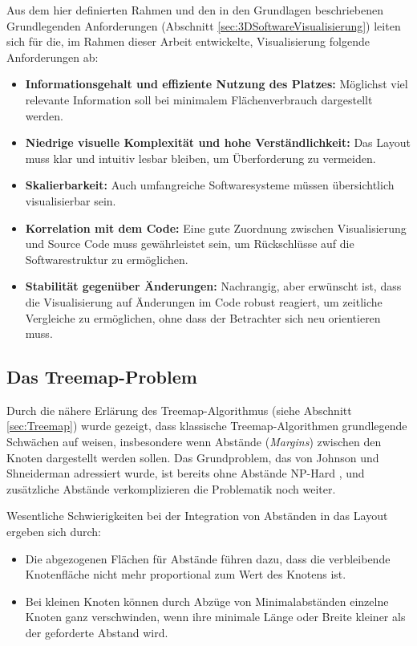 \smallskip

Aus dem hier definierten Rahmen und den in den Grundlagen beschriebenen Grundlegenden Anforderungen (Abschnitt \ref{sec:3DSoftwareVisualisierung}) leiten sich für die, im Rahmen dieser Arbeit entwickelte, Visualisierung folgende Anforderungen ab:

\begin{itemize}
    \item \textbf{Informationsgehalt und effiziente Nutzung des Platzes:} Möglichst viel relevante Information soll bei minimalem Flächenverbrauch dargestellt werden.
    \item \textbf{Niedrige visuelle Komplexität und hohe Verständlichkeit:} Das Layout muss klar und intuitiv lesbar bleiben, um Überforderung zu vermeiden.
    \item \textbf{Skalierbarkeit:} Auch umfangreiche Softwaresysteme müssen übersichtlich visualisierbar sein.
    \item \textbf{Korrelation mit dem Code:} Eine gute Zuordnung zwischen Visualisierung und Source Code muss gewährleistet sein, um Rückschlüsse auf die Softwarestruktur zu ermöglichen.
    \item \textbf{Stabilität gegenüber Änderungen:} Nachrangig, aber erwünscht ist, dass die Visualisierung auf Änderungen im Code robust reagiert, um zeitliche Vergleiche zu ermöglichen, ohne dass der Betrachter sich neu orientieren muss.
\end{itemize}

\subsection{Das Treemap-Problem} \label{sec:TreemapProblem}

Durch die nähere Erlärung des Treemap-Algorithmus (siehe Abschnitt \ref{sec:Treemap}) wurde gezeigt, dass klassische Treemap-Algorithmen grundlegende Schwächen auf weisen, insbesondere wenn Abstände (\textit{Margins}) zwischen den Knoten dargestellt werden sollen. Das Grundproblem, das von Johnson und Shneiderman \cite{johnson1991tree} adressiert wurde, ist bereits ohne Abstände NP-Hard \cite[3]{bruls2000squarified}, und zusätzliche Abstände verkomplizieren die Problematik noch weiter.

Wesentliche Schwierigkeiten bei der Integration von Abständen in das Layout ergeben sich durch:
\begin{itemize}
    \item Die abgezogenen Flächen für Abstände führen dazu, dass die verbleibende Knotenfläche nicht mehr proportional zum Wert des Knotens ist.
    \item Bei kleinen Knoten können durch Abzüge von Minimalabständen einzelne Knoten ganz verschwinden, wenn ihre minimale Länge oder Breite kleiner als der geforderte Abstand wird.
\end{itemize}

